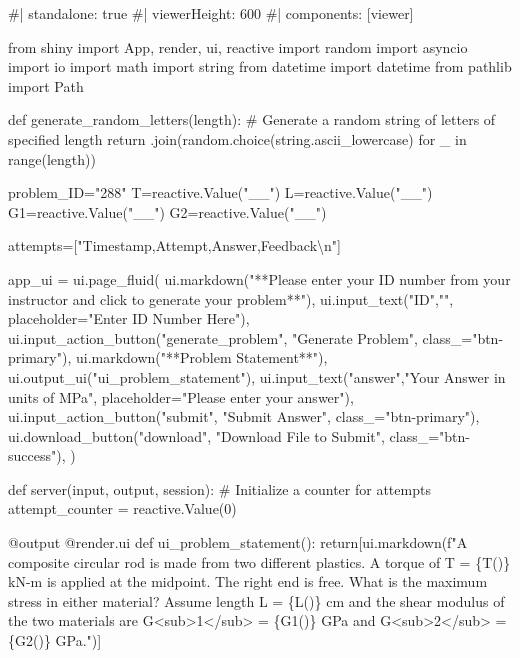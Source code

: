 \documentclass[
  letterpaper,
  DIV=11,
  numbers=noendperiod]{scrreprt}
\newenvironment{Shaded}{\begin{snugshade}}{\end{snugshade}}
\newcommand{\NormalTok}[1]{\textcolor[rgb]{0.00,0.23,0.31}{#1}}
\begin{document}
\begin{Shaded}
\begin{Highlighting}[]
\NormalTok{\#| standalone: true}
\NormalTok{\#| viewerHeight: 600}
\NormalTok{\#| components: [viewer]}

\NormalTok{from shiny import App, render, ui, reactive}
\NormalTok{import random}
\NormalTok{import asyncio}
\NormalTok{import io}
\NormalTok{import math}
\NormalTok{import string}
\NormalTok{from datetime import datetime}
\NormalTok{from pathlib import Path}

\NormalTok{def generate\_random\_letters(length):}
\NormalTok{    \# Generate a random string of letters of specified length}
\NormalTok{    return \textquotesingle{}\textquotesingle{}.join(random.choice(string.ascii\_lowercase) for \_ in range(length)) }

\NormalTok{problem\_ID="288"}
\NormalTok{T=reactive.Value("\_\_")}
\NormalTok{L=reactive.Value("\_\_")}
\NormalTok{G1=reactive.Value("\_\_")}
\NormalTok{G2=reactive.Value("\_\_")}

\NormalTok{attempts=["Timestamp,Attempt,Answer,Feedback\textbackslash{}n"]}

\NormalTok{app\_ui = ui.page\_fluid(}
\NormalTok{    ui.markdown("**Please enter your ID number from your instructor and click to generate your problem**"),}
\NormalTok{    ui.input\_text("ID","", placeholder="Enter ID Number Here"),}
\NormalTok{    ui.input\_action\_button("generate\_problem", "Generate Problem", class\_="btn{-}primary"),}
\NormalTok{    ui.markdown("**Problem Statement**"),}
\NormalTok{    ui.output\_ui("ui\_problem\_statement"),}
\NormalTok{    ui.input\_text("answer","Your Answer in units of MPa", placeholder="Please enter your answer"),}
\NormalTok{    ui.input\_action\_button("submit", "Submit Answer", class\_="btn{-}primary"),}
\NormalTok{    ui.download\_button("download", "Download File to Submit", class\_="btn{-}success"),}
\NormalTok{)}


\NormalTok{def server(input, output, session):}
\NormalTok{    \# Initialize a counter for attempts}
\NormalTok{    attempt\_counter = reactive.Value(0)}

\NormalTok{    @output}
\NormalTok{    @render.ui}
\NormalTok{    def ui\_problem\_statement():}
\NormalTok{        return[ui.markdown(f"A composite circular rod is made from two different plastics. A torque of T = \{T()\} kN{-}m is applied at the midpoint. The right end is free. What is the maximum stress in either material? Assume length L = \{L()\} cm and the shear modulus of the two materials are G\textless{}sub\textgreater{}1\textless{}/sub\textgreater{} = \{G1()\} GPa and G\textless{}sub\textgreater{}2\textless{}/sub\textgreater{} = \{G2()\} GPa.")]}
    

\end{Highlighting}
\end{Shaded}
\end{document}
